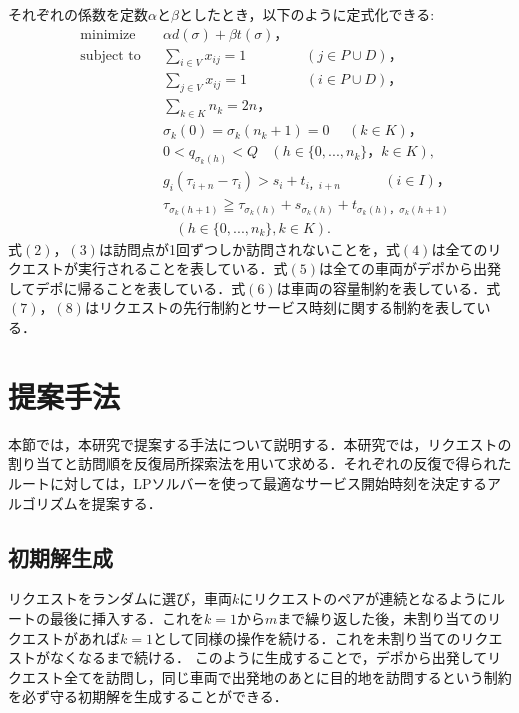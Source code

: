 \documentclass[a4j,11pt,twocolumn]{jsarticle}
\begin{document}
それぞれの係数を定数$\alpha$と$\beta$としたとき，以下のように定式化できる:
\begin{align*}
  &\textrm{minimize}   &&
  \alpha d(\sigma)+ \beta t(\sigma)，\tag{1}\\
  &\textrm{subject to} && \sum_{i \in V} x_{ij} = 1 \ \ \ \ \ \ \ \ \ \ \ \ \ \ \ \ \ \ \ (j \in  P \cup D)，\tag{2}\\
  &                    && \sum_{j \in V} x_{ij} = 1 \ \ \ \ \ \ \ \ \ \ \ \ \ \ \ \ \ \ \ (i \in  P \cup D)，\tag{3}\\
  &                    && \sum_{k \in K} n_k = 2n，\tag{4}\\
  &                    && \sigma_k(0) = \sigma_k(n_k+1) = 0 \ \ \ \ \ \ (k \in K)，\tag{5}\\
  &                    && 0 < q_{\sigma_k(h)} < Q\ \ \ \
  (h \in \{0, ... ,n_k\}，k \in K), \tag{6}\\
  &                    && g_i(\tau_{i+n}-\tau_i) > s_i + t_{i，i+n}\ \ \ \ \ \ \ \ \ \ \ \ \ \  (i \in I)，\tag{7}\\
  &                    && \tau_ {\sigma_k (h+1)} \geqq \tau_ {\sigma_k (h)} + s_{\sigma_k (h)} + t_ {\sigma_k (h)，\sigma_k (h+1)}\\
  &                    &&  \ \ \ \ (h \in \{0, ... ,n_k\},k \in K).\tag{8}
\end{align*}
式$(2)，(3)$は訪問点が1回ずつしか訪問されないことを，式$(4)$は全てのリクエストが実行されることを表している．式$(5)$は全ての車両がデポから出発してデポに帰ることを表している．式$(6)$は車両の容量制約を表している．式$(7)，(8)$はリクエストの先行制約とサービス時刻に関する制約を表している．

\section{提案手法}
本節では，本研究で提案する手法について説明する．本研究では，リクエストの割り当てと訪問順を反復局所探索法を用いて求める．それぞれの反復で得られたルートに対しては，LPソルバーを使って最適なサービス開始時刻を決定するアルゴリズムを提案する．

\subsection{{\large 初期解生成}}
リクエストをランダムに選び，車両$k$にリクエストのペアが連続となるようにルートの最後に挿入する．これを$k = 1 から m$まで繰り返した後，未割り当てのリクエストがあれば$k = 1 $として同様の操作を続ける．これを未割り当てのリクエストがなくなるまで続ける．
このように生成することで，デポから出発してリクエスト全てを訪問し，同じ車両で出発地のあとに目的地を訪問するという制約を必ず守る初期解を生成することができる．
\end{document}
